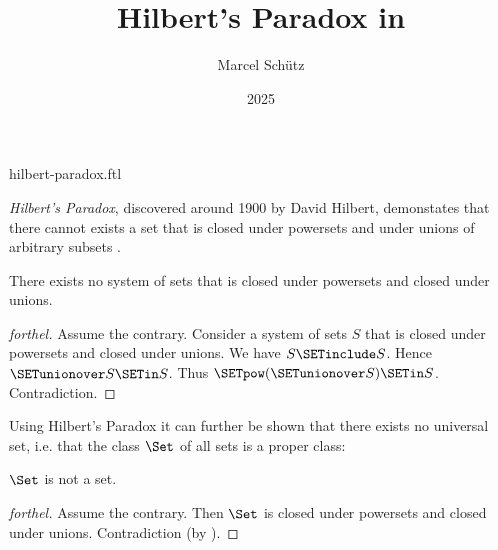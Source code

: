 \documentclass{stex}
\title{Hilbert's Paradox in \Naproche}
\author{Marcel Schütz}
\date{2025}
\begin{document}
\begin{smodule}{hilbert-paradox.ftl}
\maketitle


\noindent \emph{Hilbert's Paradox}, discovered around 1900 by David Hilbert, 
demonstates that there cannot exists a set that is closed under powersets and 
under unions of arbitrary subsets \cite{PeckhausKahl2002}.

\begin{theorem}[forthel,title=Hilbert's Paradox,id=hilbert_paradox]
  There exists no system of sets that is closed under powersets and closed under unions.
\end{theorem}
\begin{proof}[forthel]
  Assume the contrary.
  Consider a system of sets $S$ that is closed under powersets and closed under unions.
  We have $S \SETinclude S$.
  Hence $\SETunionover S \SETin S$.
  Thus $\SETpow(\SETunionover S) \SETin S$.
  Contradiction.
\end{proof}

\noindent Using Hilbert's Paradox it can further be shown that there exists 
no universal set, i.e. that the class $\Set$ of all sets is a proper class:

\begin{proposition}[forthel,id=hilbert_paradox_corollary]
  $\Set$ is not a set.
\end{proposition}
\begin{proof}[forthel]
  Assume the contrary.
  Then $\Set$ is closed under powersets and closed under unions.
  Contradiction (by ).
\end{proof}

\printbibliography
{}
\end{smodule}
\end{document}
